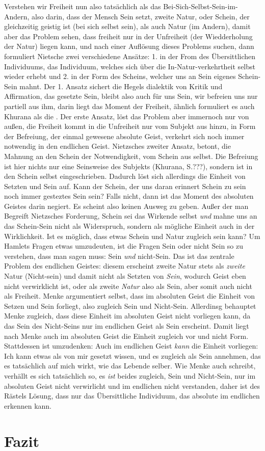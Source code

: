 \documentclass[12pt, a4paper, openany]{report}
\begin{document}
Verstehen wir Freiheit nun also tatsächlich als das Bei-Sich-Selbst-Sein-im-Andern, also darin, dass der Mensch Sein setzt, zweite Natur, oder Schein, der gleichzeitig geistig ist (bei sich selbst sein), als auch Natur (im Andern), damit aber das Problem sehen, dass freiheit nur in der Unfreiheit (der Wiedderholung der Natur) liegen kann, und nach einer Auflösung dieses Problems suchen, dann formuliert Nietsche zwei verschiedene Ansätze:
1. in der From des Übersittlichen Individuums, das Individuum, welches sich über die In-Natur-verkehrtheit selbst wieder erhebt
und 2. in der Form des Scheins, welcher uns an Sein eigenes Schein-Sein mahnt.
Der 1. Ansatz sichert die Hegels dialektik von Kritik und Affirmation, das gesetzte Sein, bleibt also auch für uns Sein, wir befreien uns nur partiell aus ihm, darin liegt das Moment der Freiheit, ähnlich formuliert es auch Khurana als die .
Der erste Ansatz, löst das Problem aber immernoch nur von außen, die Freiheit kommt in die Unfreiheit nur vom Subjekt aus hinzu, in Form der Befreiung, der einmal gewesene absolute Geist, verkehrt sich noch immer notwendig in den endlichen Geist.
Nietzsches zweiter Ansatz, betont, die Mahnung an den Schein der Notwendigkeit, vom Schein aus selbst.
Die Befreiung ist hier nichts nur eine Seinsweise des Subjekts (Khurana, S.???), sondern ist in den Schein selbst eingeschrieben.
Dadurch löst sich allerdings die Einheit von Setzten und Sein auf.
Kann der Schein, der uns daran erinnert Schein zu sein noch immer gesteztes Sein sein? 
Falls nicht, dann ist das Moment des absoluten Geistes darin negiert. 
Es scheint also keinen Ausweg zu geben. 
Außer der man Begreift Nietzsches Forderung, Schein sei das Wirkende selbst \emph{und} mahne uns an das Schein-Sein nicht als Widerspruch, sondern als mögliche Einheit auch in der Wirklichkeit. 
Ist es möglich, dass etwas Schein und Natur zugleich sein kann? 
Um Hamlets Fragen etwas umzudeuten, ist die Fragen Sein oder nicht Sein so zu verstehen, dass man sagen muss: Sein \emph{und} nicht-Sein. 
Das ist das zentrale Problem des endlichen Geistes: 
diesem erscheint zweite Natur stets als \emph{zweite} Natur (Nicht-sein) und damit nicht als Setzten von \emph{Sein}, wodurch Geist eben nicht verwirklicht ist, oder als zweite \emph{Natur} also als Sein, aber somit auch nicht als Freiheit. 
Menke argumentiert selbst, dass im absoluten Geist die Einheit von Setzen und Sein forliegt, also zugleich Sein und Nicht-Sein. 
Allerdinsg behauptet Menke zugleich, dass diese Einheit im absoluten Geist nicht vorliegen kann, da das Sein des Nicht-Seins nur im endlichen Geist als Sein erscheint. 
Damit liegt nach Menke auch im absoluten Geist die Einheit zugleich vor und nicht Form. 
Stattdessen ist umzudenken: 
Auch im endlichen Geist \emph{kann} die Einheit vorliegen: 
Ich kann etwas als von mir gesetzt wissen, und es zugleich als Sein annehmen, das es tatsächlich auf mich wirkt, wie das Lebende selber. 
Wie Menke auch schreibt, verhällt es sich tatsächlich so, es \emph{ist} beides zugleich, Sein und Nicht-Sein, nur im absoluten Geist nicht verwirlicht und im endlichen nicht verstanden, daher ist des Rästels Lösung, dass nur das Übersittliche Individuum, das absolute im endlichen erkennen kann. 


\chapter{Fazit}

\backmatter

\printbibliography
\listoftodos
 
\end{document}

